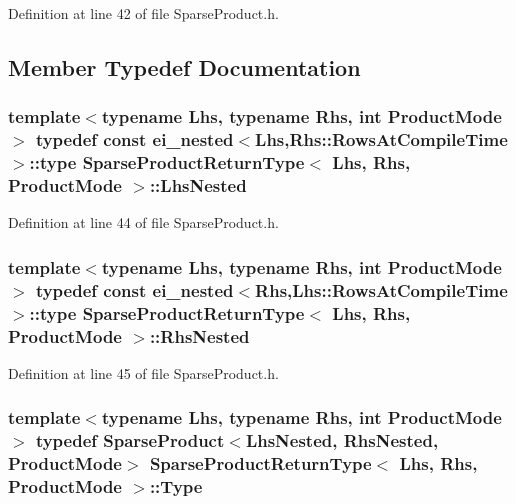 Definition at line 42 of file Sparse\-Product.\-h.



\subsection{Member Typedef Documentation}
\hypertarget{struct_sparse_product_return_type_ab79998bc0fe82c34b85f49ec6524b120}{
\subsubsection[{Lhs\-Nested}]{\setlength{\rightskip}{0pt plus 5cm}template$<$typename Lhs, typename Rhs, int Product\-Mode$>$ typedef const {\bf ei\-\_\-nested}$<$Lhs,Rhs\-::\-Rows\-At\-Compile\-Time$>$\-::{\bf type} {\bf Sparse\-Product\-Return\-Type}$<$ Lhs, Rhs, Product\-Mode $>$\-::{\bf Lhs\-Nested}}}\label{struct_sparse_product_return_type_ab79998bc0fe82c34b85f49ec6524b120}


Definition at line 44 of file Sparse\-Product.\-h.

\hypertarget{struct_sparse_product_return_type_aae08a821c3da300bea20971f5d2165e0}{
\subsubsection[{Rhs\-Nested}]{\setlength{\rightskip}{0pt plus 5cm}template$<$typename Lhs, typename Rhs, int Product\-Mode$>$ typedef const {\bf ei\-\_\-nested}$<$Rhs,Lhs\-::\-Rows\-At\-Compile\-Time$>$\-::{\bf type} {\bf Sparse\-Product\-Return\-Type}$<$ Lhs, Rhs, Product\-Mode $>$\-::{\bf Rhs\-Nested}}}\label{struct_sparse_product_return_type_aae08a821c3da300bea20971f5d2165e0}


Definition at line 45 of file Sparse\-Product.\-h.

\hypertarget{struct_sparse_product_return_type_a832768e07833711d1e9bf6f6e3d3b346}{
\subsubsection[{Type}]{\setlength{\rightskip}{0pt plus 5cm}template$<$typename Lhs, typename Rhs, int Product\-Mode$>$ typedef {\bf Sparse\-Product}$<${\bf Lhs\-Nested}, {\bf Rhs\-Nested}, Product\-Mode$>$ {\bf Sparse\-Product\-Return\-Type}$<$ Lhs, Rhs, Product\-Mode $>$\-::{\bf Type}}}\label{struct_sparse_product_return_type_a832768e07833711d1e9bf6f6e3d3b346}


